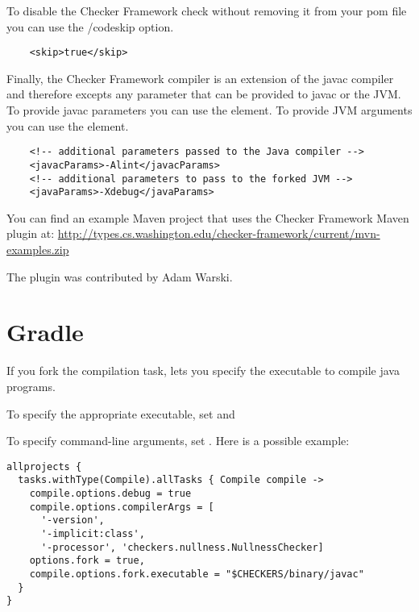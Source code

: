 \begin{enumerate}
To disable the Checker Framework check without removing it from your pom file you can use the /code{skip} option.
\begin{Verbatim}
    <skip>true</skip>
\end{Verbatim}

Finally, the Checker Framework compiler is an extension of the javac compiler and therefore excepts any parameter
that can be provided to javac or the JVM.  To provide javac parameters you can use the 
element.  To provide JVM arguments you can use the  element.

\begin{Verbatim}
    <!-- additional parameters passed to the Java compiler -->
    <javacParams>-Alint</javacParams>
    <!-- additional parameters to pass to the forked JVM -->
    <javaParams>-Xdebug</javaParams>
\end{Verbatim}

\end{enumerate}

You can find an example Maven project that uses the Checker Framework Maven plugin at:
\url{http://types.cs.washington.edu/checker-framework/current/mvn-examples.zip}

The plugin was contributed by Adam Warski.


\section{Gradle\label{gradle}}


If you fork the compilation task, 
lets you specify the executable to compile java programs.

To specify the appropriate executable, set
 and

To specify command-line arguments, set
.  Here is a possible example:

\begin{Verbatim}
allprojects {
  tasks.withType(Compile).allTasks { Compile compile ->
    compile.options.debug = true
    compile.options.compilerArgs = [
      '-version',
      '-implicit:class',
      '-processor', 'checkers.nullness.NullnessChecker]
    options.fork = true,
    compile.options.fork.executable = "$CHECKERS/binary/javac"
  }
}
\end{Verbatim}

